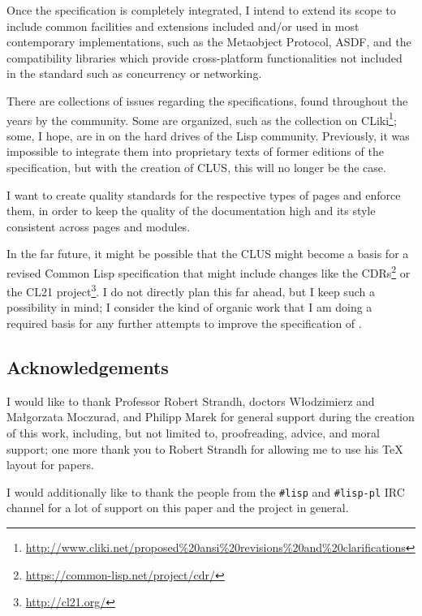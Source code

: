 Once the specification is completely integrated, I intend to extend its scope to include common facilities and extensions included and/or used in most contemporary \cl{} implementations, such as the Metaobject Protocol, ASDF, \ql{} and the compatibility libraries which provide cross-platform functionalities not included in the standard such as concurrency or networking.

There are collections of issues regarding the specifications, found throughout the years by the community. Some are organized, such as the collection on CLiki\footnote{\url{http://www.cliki.net/proposed\%20ansi\%20revisions\%20and\%20clarifications}}; some, I hope, are in on the hard drives of the Lisp community. Previously, it was impossible to integrate them into proprietary texts of former editions of the specification, but with the creation of CLUS, this will no longer be the case.

I want to create quality standards for the respective types of pages and enforce them, in order to keep the quality of the documentation high and its style consistent across pages and modules.

In the far future, it might be possible that the CLUS might become a basis for a revised Common Lisp specification that might include changes like the CDRs\footnote{\url{https://common-lisp.net/project/cdr/}} or the CL21 project\footnote{\url{http://cl21.org/}}. I do not directly plan this far ahead, but I keep such a possibility in mind; I consider the kind of organic work that I am doing a required basis for any further attempts to improve the specification of \cl{}.

\subsection{Acknowledgements}

I would like to thank Professor Robert Strandh, doctors Włodzimierz and Małgorzata Moczurad, and Philipp Marek for general support during the creation of this work, including, but not limited to, proofreading, advice, and moral support; one more thank you to Robert Strandh for allowing me to use his \TeX{} layout for papers.

I would additionally like to thank the people from the \texttt{\#lisp} and \texttt{\#lisp-pl} IRC channel for a lot of support on this paper and the \cl{} \us{} project in general.
